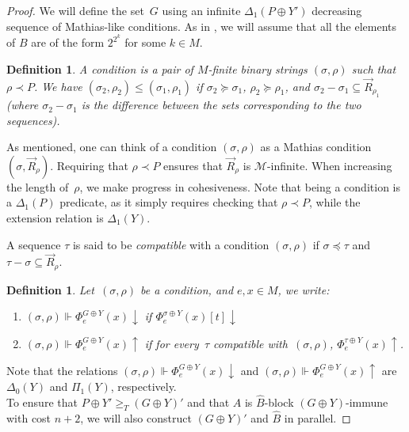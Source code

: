 \documentclass{article}
\def\M{\mathcal{M}}
\numberwithin{theorem}{section}
\newtheorem{definition}[theorem]{Definition}
\begin{document}
\begin{proof}
We will define the set~$G$ using an infinite $\Delta_1(P \oplus Y')$ decreasing sequence of Mathias-like conditions. As in , we will assume that all the elements of $B$ are of the form $2^{2^k}$ for some $k \in M$.

\begin{definition}
A \emph{condition} is a pair of $M$-finite binary strings $(\sigma,\rho)$ such that $\rho \prec P$.
We have $(\sigma_2,\rho_2) \leq (\sigma_1,\rho_1)$ if $\sigma_2 \succeq \sigma_1$, $\rho_2 \succeq \rho_1$, and $\sigma_2 - \sigma_1 \subseteq \vec{R}_{\rho_1}$ (where $\sigma_2 - \sigma_1$ is the difference between the sets corresponding to the two sequences).
\end{definition}

As mentioned, one can think of a condition $(\sigma, \rho)$ as a Mathias condition $(\sigma, \vec{R}_\rho)$. Requiring that $\rho \prec P$ ensures that $\vec{R}_\rho$ is $\M$-infinite. When increasing the length of~$\rho$, we make progress in cohesiveness.
Note that being a condition is a $\Delta_1(P)$ predicate, as it simply requires checking that $\rho \prec P$, while the extension relation is $\Delta_1(Y)$. 

A sequence $\tau$ is said to be \emph{compatible} with a condition $(\sigma,\rho)$ if $\sigma \preceq \tau$ and  $\tau - \sigma \subseteq \vec{R}_{\rho}$.

\begin{definition}
Let~$(\sigma, \rho)$ be a condition, and $e,x \in M$, we write:
\begin{enumerate}
    \item[1.] $(\sigma, \rho) \Vdash \Phi^{G \oplus Y}_e(x)\downarrow$ if $\Phi^{\sigma \oplus Y}_e(x)[t]\downarrow$
    \item[2.] $(\sigma, \rho) \Vdash \Phi^{G \oplus Y}_e(x)\uparrow$ if for every~$\tau$ compatible with~$(\sigma, \rho)$, $\Phi^{\tau \oplus Y}_e(x)\uparrow$.
\end{enumerate}
\end{definition}

Note that the relations $(\sigma, \rho) \Vdash \Phi^{G \oplus Y}_e(x)\downarrow$
and $(\sigma, \rho) \Vdash \Phi^{G \oplus Y}_e(x)\uparrow$ are $\Delta_0(Y)$ and $\Pi_1(Y)$, respectively. \\

To ensure that $P \oplus Y' \geq_T (G \oplus Y)'$ and that $A$ is $\hat{B}$-block $(G \oplus Y)$-immune with cost $n+2$, we will also construct $(G \oplus Y)'$ and $\hat{B}$ in parallel. 


\end{proof}
\end{document}
